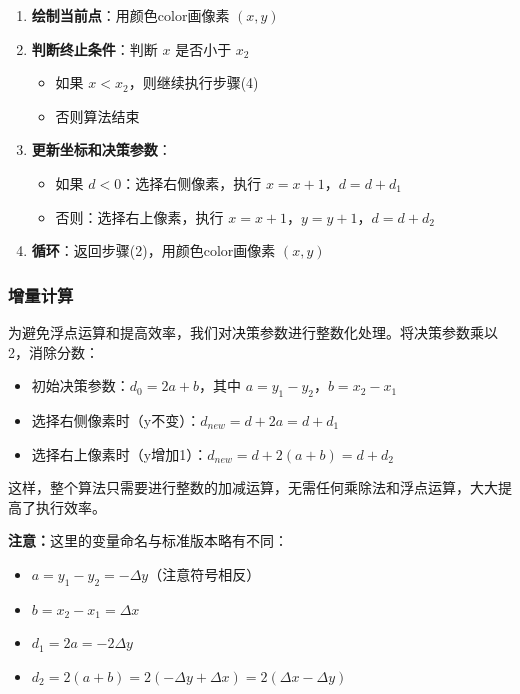 \documentclass[12pt,a4paper]{article}
\begin{document}
\begin{tcolorbox}
\begin{enumerate}
    \item \textbf{绘制当前点}：用颜色color画像素 $(x, y)$
    
    \item \textbf{判断终止条件}：判断 $x$ 是否小于 $x_2$
    \begin{itemize}
        \item 如果 $x < x_2$，则继续执行步骤(4)
        \item 否则算法结束
    \end{itemize}
    
    \item \textbf{更新坐标和决策参数}：
    \begin{itemize}
        \item 如果 $d < 0$：选择右侧像素，执行 $x = x + 1$，$d = d + d_1$
        \item 否则：选择右上像素，执行 $x = x + 1$，$y = y + 1$，$d = d + d_2$
    \end{itemize}
    
    \item \textbf{循环}：返回步骤(2)，用颜色color画像素 $(x, y)$
\end{enumerate}

\subsubsection*{增量计算}

为避免浮点运算和提高效率，我们对决策参数进行整数化处理。将决策参数乘以2，消除分数：
\begin{itemize}
    \item 初始决策参数：$d_0 = 2a + b$，其中 $a = y_1 - y_2$，$b = x_2 - x_1$
    \item 选择右侧像素时（y不变）：$d_{new} = d + 2a = d + d_1$
    \item 选择右上像素时（y增加1）：$d_{new} = d + 2(a+b) = d + d_2$
\end{itemize}

这样，整个算法只需要进行整数的加减运算，无需任何乘除法和浮点运算，大大提高了执行效率。

\textbf{注意：}这里的变量命名与标准版本略有不同：
\begin{itemize}
    \item $a = y_1 - y_2 = -\Delta y$（注意符号相反）
    \item $b = x_2 - x_1 = \Delta x$
    \item $d_1 = 2a = -2\Delta y$
    \item $d_2 = 2(a + b) = 2(-\Delta y + \Delta x) = 2(\Delta x - \Delta y)$
\end{itemize}

\end{tcolorbox}
\end{document}
